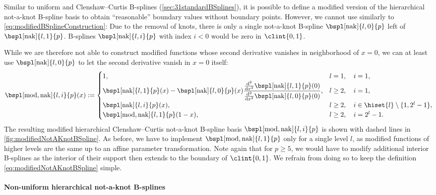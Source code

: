 Similar to uniform and Clenshaw--Curtis B-splines
(\cref{sec:31standardBSplines}),
it is possible to define a modified version of the
hierarchical not-a-knot B-spline basis to obtain
``reasonable'' boundary values without boundary points.
However, we cannot use  similarly to
\eqref{eq:modifiedBSplineConstruction}:
Due to the removal of knots, there is only a single
not-a-knot B-spline $\bspl[\nak]{l,0}{p}$ left of
$\bspl[\nak]{l,1}{p}$.
B-splines $\bspl[\nak]{l,i}{p}$ with index $i < 0$
would be zero in $\clint{0, 1}$.

While we are therefore not able to construct modified functions
whose second derivative vanishes in neighborhood of $x = 0$,
we can at least use $\bspl[\nak]{l,0}{p}$ to let the
second derivative vanish in $x = 0$ itself:
\begin{equation}
  \label{eq:modifiedNotAKnotBSpline}
  \bspl[\modified,\nak]{l,i}{p}(x)
  :=
  \begin{cases}
    1,&
    l = 1,\quad i = 1,\\
    \bspl[\nak]{l,1}{p}(x)
    - \bspl[\nak]{l,0}{p}(x)
    \dfrac{\frac{\diff^2}{\dx^2} \bspl[\nak]{l,1}{p}(0)}%
    {\frac{\diff^2}{\dx^2} \bspl[\nak]{l,0}{p}(0)},&
    l \ge 2,\quad i = 1,\\
    \bspl[\nak]{l,i}{p}(x),&
    l \ge 2,\quad i \in \hiset{l} \setminus \{1, 2^l - 1\},\\
    \bspl[\modified,\nak]{l,1}{p}(1 - x),&
    l \ge 2,\quad i = 2^l - 1.
  \end{cases}
  \hspace*{-2mm}
\end{equation}
The resulting modified hierarchical Clenshaw--Curtis not-a-knot B-spline basis
$\bspl[\modified,\nak]{l,i}{p}$ is shown with dashed lines
in \cref{fig:modifiedNotAKnotBSpline}.
As before, we have to implement $\bspl[\modified,\nak]{l,1}{p}$
only for a single level $l$, as modified functions of higher levels
are the same up to an affine parameter transformation.
Note again that for $p \ge 5$, we would have to modify additional
interior B-splines as the interior of their support then extends to the
boundary of $\clint{0, 1}$.
We refrain from doing so to keep the definition
\eqref{eq:modifiedNotAKnotBSpline} simple.

\paragraph{Non-uniform hierarchical not-a-knot B-splines}

